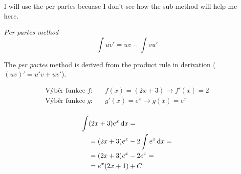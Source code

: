I will use the per partes becuase 
I don't see how the sub-method will 
help me here.

\begin{center}
    \textit{Per partes method}
    $$ \int uv' = uv - \int vu' $$
\end{center}

The \textit{per partes} method is derived 
from the product rule in derivation ($(uv)' = u'v + uv'$).

\[
\begin{aligned}
    \text{Výběr funkce $f$:} & \quad f(x) = (2x + 3) \rightarrow f'(x) = 2 \\
    \text{Výběr funkce $g$:} & \quad g'(x) = e^x \rightarrow g(x) = e^x  \\
\end{aligned}
\]

\begin{align}
    \int &(2x + 3)e^x \mathop{}\!\mathrm{d}{x} =\\
    &= (2x+3)e^x - 2\int e^x \mathop{}\!\mathrm{d}{x} =\\
    &= (2x+3)e^x - 2e^x = \\
    &= e^x(2x + 1) + C 
\end{align}
